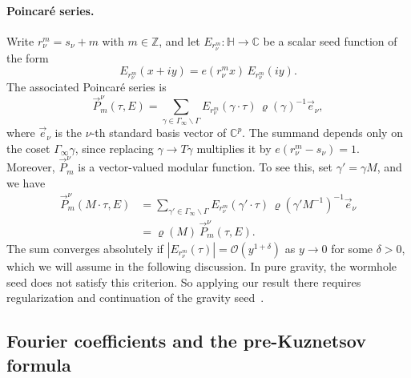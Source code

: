 \documentclass[11pt]{article}
\numberwithin{equation}{section}
\begin{document}
\paragraph{Poincar\'e series.}
Write $r_\nu^m=s_\nu+m$ with $m\in\mathbb Z$, and let $E_{r_\nu^m}:\mathbb H\to\mathbb C$
be a scalar seed function of the form
\begin{equation}
  E_{r_\nu^m}(x+iy)=e(r_\nu^m x)\,E_{r_\nu^m}(iy).
\end{equation}
The associated Poincar\'e series is
\begin{equation}
  \vec P_m^\nu(\tau,E)
  =\sum_{\gamma\in\Gamma_\infty\backslash\Gamma}
  E_{r_\nu^m}(\gamma\cdot\tau)\,\varrho(\gamma)^{-1}\vec e_\nu,
  \label{eq:poincare_series_vec}
\end{equation}
where $\vec e_\nu$ is the $\nu$-th standard basis vector of $\mathbb C^p$. The summand
depends only on the coset $\Gamma_\infty\gamma$, since replacing $\gamma\to T\gamma$
multiplies it by $e(r_\nu^m-s_\nu)=1$. Moreover, $\vec P_m^\nu$ is a vector-valued
modular function. To see this, set $\gamma'=\gamma M$, and we have 
\begin{equation}
\begin{aligned}
  \vec P_m^\nu(M\cdot\tau,E)
  &=\sum_{\gamma'\in\Gamma_\infty\backslash\Gamma}
  E_{r_\nu^m}(\gamma'\cdot\tau)\,
  \varrho(\gamma'M^{-1})^{-1}\vec e_\nu\\
  &=\varrho(M)\,\vec P_m^\nu(\tau,E).
\end{aligned}
\label{eq:PS_VMF}
\end{equation}
The sum converges absolutely if $|E_{r_\nu^m}(\tau)|=\mathcal O(y^{1+\delta})$ as $y\to0$
for some $\delta>0$, which we will assume in the following discussion. In pure gravity, the wormhole seed does not satisfy this criterion. So applying our result there requires regularization and continuation of the gravity seed~\cite{Cotler:2020ugk}. 

\subsection{Fourier coefficients and the pre-Kuznetsov formula}
\end{document}
